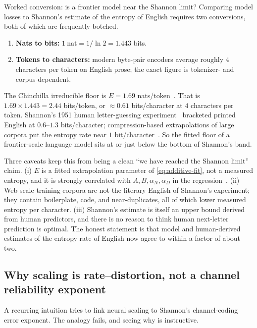 \documentclass[11pt,a4paper]{article}
\theoremstyle{definition}
\begin{document}
\begin{intuition}{Worked conversion: is a frontier model near the Shannon limit?}
Comparing model losses to Shannon's estimate of the entropy of English requires two conversions, both of which are frequently botched.
\begin{enumerate}[leftmargin=1.5em,nosep]
  \item \textbf{Nats to bits:} $1\ \text{nat} = 1/\ln 2 = 1.443$ bits.
  \item \textbf{Tokens to characters:} modern byte-pair encoders average roughly $4$ characters per token on English prose; the exact figure is tokenizer- and corpus-dependent.
\end{enumerate}
The Chinchilla irreducible floor is $E = 1.69$ nats/token~\cite{hoffmann2022training}. That is $1.69\times 1.443 = 2.44$ bits/token, or $\approx 0.61$ bits/character at $4$ characters per token. Shannon's 1951 human letter-guessing experiment~\cite{shannon1951prediction} bracketed printed English at $0.6$--$1.3$ bits/character; compression-based extrapolations of large corpora put the entropy rate near $1$ bit/character~\cite{takahira2016entropy}. So the fitted floor of a frontier-scale language model sits at or just below the bottom of Shannon's band.

Three caveats keep this from being a clean ``we have reached the Shannon limit'' claim. (i) $E$ is a fitted extrapolation parameter of \eqref{eq:additive-fit}, not a measured entropy, and it is strongly correlated with $A,B,\alpha_N,\alpha_D$ in the regression~\cite{besiroglu2024chinchilla}. (ii) Web-scale training corpora are not the literary English of Shannon's experiment; they contain boilerplate, code, and near-duplicates, all of which lower measured entropy per character. (iii) Shannon's estimate is itself an upper bound derived from human predictors, and there is no reason to think human next-letter prediction is optimal. The honest statement is that model and human-derived estimates of the entropy rate of English now agree to within a factor of about two.
\end{intuition}

\subsection{Why scaling is rate--distortion, not a channel reliability exponent}
\label{subsec:channel_vs_rd}

A recurring intuition tries to link neural scaling to Shannon's channel-coding error exponent. The analogy fails, and seeing why is instructive.
\end{document}
